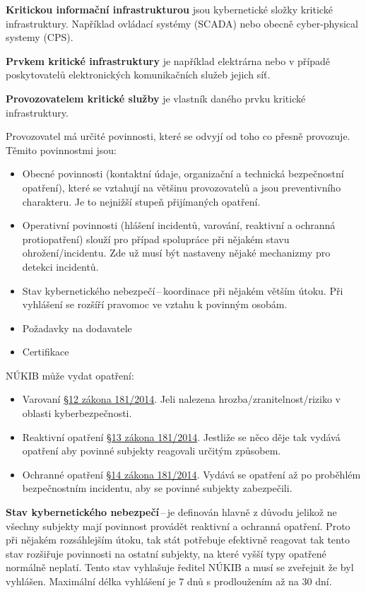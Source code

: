 \noindent\textbf{Kritickou informační infrastrukturou} jsou kybernetické složky kritické infrastruktury. Například ovládací systémy (SCADA) nebo obecně cyber-physical systemy (CPS).

\noindent\textbf{Prvkem kritické infrastruktury} je například elektrárna nebo v případě poskytovatelů elektronických komunikačních služeb jejich síť.

\noindent\textbf{Provozovatelem kritické služby} je vlastník daného prvku kritické infrastruktury.

Provozovatel má určité povinnosti, které se odvyjí od toho co přesně provozuje. Těmito povinnostmi jsou:
\begin{itemize}[noitemsep]
    \item Obecné povinnosti (kontaktní údaje, organizační a technická bezpečnostní opatření), které se vztahují na většinu provozovatelů a jsou preventivního charakteru. Je to nejnižší stupeň přijímaných opatření.
    \item  Operativní povinnosti (hlášení incidentů, varování, reaktivní a ochranná protiopatření) slouží pro případ spolupráce při nějakém stavu ohrožení/incidentu. Zde už musí být nastaveny nějaké mechanizmy pro detekci incidentů.
    \item Stav kybernetického nebezpečí\,--\,koordinace při nějakém větším útoku. Při vyhlášení se rozšíří pravomoc ve vztahu k povinným osobám. 
    \item Požadavky na dodavatele
    \item Certifikace
\end{itemize}
NÚKIB může vydat opatření:
\begin{itemize}[noitemsep]
    \item Varovaní \href{https://www.zakonyprolidi.cz/cs/2014-181#p12}{§12 zákona 181/2014}. Jeli nalezena hrozba/zranitelnost/riziko v oblasti kyberbezpečnosti. 
    \item Reaktivní opatření \href{https://www.zakonyprolidi.cz/cs/2014-181#p13}{§13 zákona 181/2014}. Jestliže se něco děje tak vydává opatření aby povinné subjekty reagovali určitým způsobem.
    \item Ochranné opatření \href{https://www.zakonyprolidi.cz/cs/2014-181#p14}{§14 zákona 181/2014}. Vydává se opatření až po proběhlém bezpečnostním incidentu, aby se povinné subjekty zabezpečili.
\end{itemize}

\textbf{Stav kybernetického nebezpečí}\,--\,je definován hlavně z důvodu jelikož ne všechny subjekty mají povinnost provádět reaktivní a ochranná opatření. Proto při nějakém rozsáhlejším útoku, tak stát potřebuje efektivně reagovat tak tento stav rozšiřuje povinnosti na ostatní subjekty, na které vyšší typy opatřené normálně neplatí. Tento stav vyhlašuje ředitel NÚKIB  a musí se zveřejnit že byl vyhlášen. Maximální délka vyhlášení je 7 dnů s prodloužením až na 30 dní.

